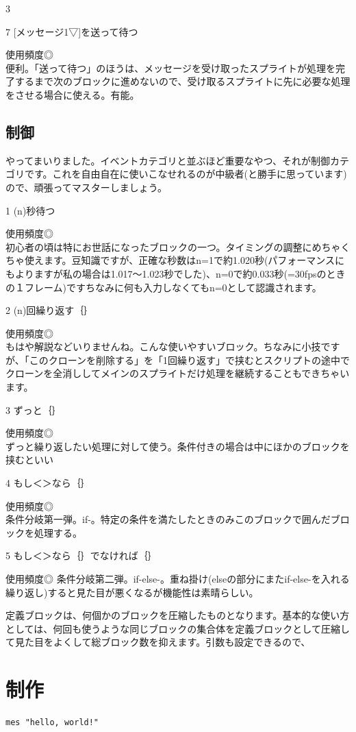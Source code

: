 \documentclass[b5paper,10pt]{jsarticle}
\begin{document}
\begin{multicols*}{3}
\begin{itembox}{7}
[メッセージ1▽]を送って待つ
\end{itembox}
使用頻度◎\\
便利。「送って待つ」のほうは、メッセージを受け取ったスプライトが処理を完了するまで次のブロックに進めないので、受け取るスプライトに先に必要な処理をさせる場合に使える。有能。

\subsection{制御}
やってまいりました。イベントカテゴリと並ぶほど重要なやつ、それが制御カテゴリです。これを自由自在に使いこなせれるのが中級者(と勝手に思っています)ので、頑張ってマスターしましょう。

\begin{itembox}{1}
(n)秒待つ
\end{itembox}
使用頻度◎\\
初心者の頃は特にお世話になったブロックの一つ。タイミングの調整にめちゃくちゃ使えます。豆知識ですが、正確な秒数はn=1で約1.020秒(パフォーマンスにもよりますが私の場合は1.017～1.023秒でした)、n=0で約0.033秒(=30fpsのときの１フレーム)ですちなみに何も入力しなくてもn=0として認識されます。
\begin{itembox}{2}
(n)回繰り返す｛｝
\end{itembox}
使用頻度◎\\
もはや解説などいりませんね。こんな使いやすいブロック。ちなみに小技ですが、「このクローンを削除する」を「1回繰り返す」で挟むとスクリプトの途中でクローンを全消ししてメインのスプライトだけ処理を継続することもできちゃいます。
\begin{itembox}{3}
ずっと｛｝
\end{itembox}
使用頻度◎\\
ずっと繰り返したい処理に対して使う。条件付きの場合は中にほかのブロックを挟むといい
\begin{itembox}{4}
もし＜＞なら｛｝
\end{itembox}
使用頻度◎\\
条件分岐第一弾。if-。特定の条件を満たしたときのみこのブロックで囲んだブロックを処理する。
\begin{itembox}{5}
もし＜＞なら｛｝でなければ｛｝
\end{itembox}
使用頻度◎
条件分岐第二弾。if-else-。重ね掛け(elseの部分にまたif-else-を入れる繰り返し)すると見た目が悪くなるが機能性は素晴らしい。


定義ブロックは、何個かのブロックを圧縮したものとなります。基本的な使い方としては、何回も使うような同じブロックの集合体を定義ブロックとして圧縮して見た目をよくして総ブロック数を抑えます。引数も設定できるので、


\section{制作}
\begin{lstlisting}[caption=Sample]
mes "hello, world!"
\end{lstlisting}

\end{multicols*}
\end{document}
